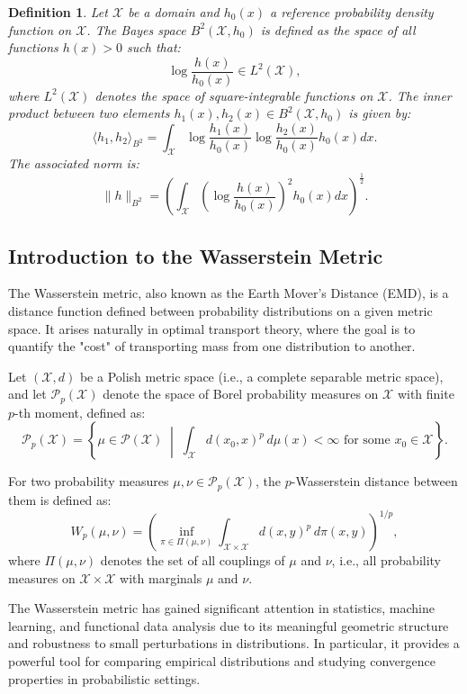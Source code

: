 \documentclass[article]{abntex2}
\newtheorem{definition}{Definition} %
\begin{document}
\begin{definition}

Let $\mathcal{X}$ be a domain and $h_0(x)$ a reference probability density function on $\mathcal{X}$. The \emph{Bayes space} $B^2(\mathcal{X}, h_0)$ is defined as the space of all functions $h(x) > 0$ such that:
\[
\log \frac{h(x)}{h_0(x)} \in L^2(\mathcal{X}),
\]
where $L^2(\mathcal{X})$ denotes the space of square-integrable functions on $\mathcal{X}$. The inner product between two elements $h_1(x), h_2(x) \in B^2(\mathcal{X}, h_0)$ is given by:
\[
\langle h_1, h_2 \rangle_{B^2} = \int_{\mathcal{X}} \log \frac{h_1(x)}{h_0(x)} \log \frac{h_2(x)}{h_0(x)} h_0(x) dx.
\]
The associated norm is:
\[
\| h \|_{B^2} = \left( \int_{\mathcal{X}} \left( \log \frac{h(x)}{h_0(x)} \right)^2 h_0(x) dx \right)^{\frac{1}{2}}.
\]
\end{definition}

\subsection{Introduction to the Wasserstein Metric}

The Wasserstein metric, also known as the Earth Mover's Distance (EMD), is a distance function defined between probability distributions on a given metric space. It arises naturally in optimal transport theory, where the goal is to quantify the "cost" of transporting mass from one distribution to another.

Let $(\mathcal{X}, d)$ be a Polish metric space (i.e., a complete separable metric space), and let $\mathcal{P}_p(\mathcal{X})$ denote the space of Borel probability measures on $\mathcal{X}$ with finite $p$-th moment, defined as:
\[
\mathcal{P}_p(\mathcal{X}) = \left\{ \mu \in \mathcal{P}(\mathcal{X}) \; \middle| \; \int_{\mathcal{X}} d(x_0, x)^p \, d\mu(x) < \infty \text{ for some } x_0 \in \mathcal{X} \right\}.
\]

For two probability measures $\mu, \nu \in \mathcal{P}_p(\mathcal{X})$, the $p$-Wasserstein distance between them is defined as:
\[
W_p(\mu, \nu) = \left( \inf_{\pi \in \Pi(\mu, \nu)} \int_{\mathcal{X} \times \mathcal{X}} d(x, y)^p \, d\pi(x, y) \right)^{1/p},
\]
where $\Pi(\mu, \nu)$ denotes the set of all couplings of $\mu$ and $\nu$, i.e., all probability measures on $\mathcal{X} \times \mathcal{X}$ with marginals $\mu$ and $\nu$.

The Wasserstein metric has gained significant attention in statistics, machine learning, and functional data analysis due to its meaningful geometric structure and robustness to small perturbations in distributions. In particular, it provides a powerful tool for comparing empirical distributions and studying convergence properties in probabilistic settings.
\end{document}
